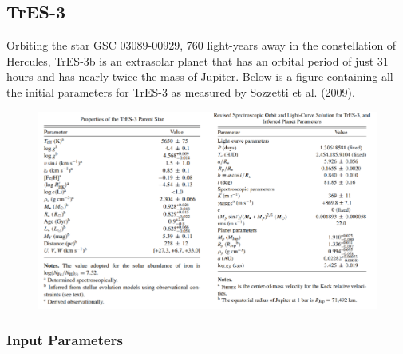 \documentclass[11pt]{article}
\begin{document}
\hypertarget{tres-3}{%
\subsection{TrES-3}\label{tres-3}}

Orbiting the star GSC 03089-00929, 760 light-years away in the
constellation of Hercules, TrES-3b is an extrasolar planet that has an
orbital period of just 31 hours and has nearly twice the mass of
Jupiter. Below is a figure containing all the initial parameters for TrES-3 as measured by Sozzetti et al. (2009).

\begin{figure}
	\centering
	\includegraphics[width=1\linewidth]{../images/TrES-3_combined.png}
	\label{Tab 2}
\end{figure}

\medskip

\subsubsection*{Input Parameters}
\end{document}
